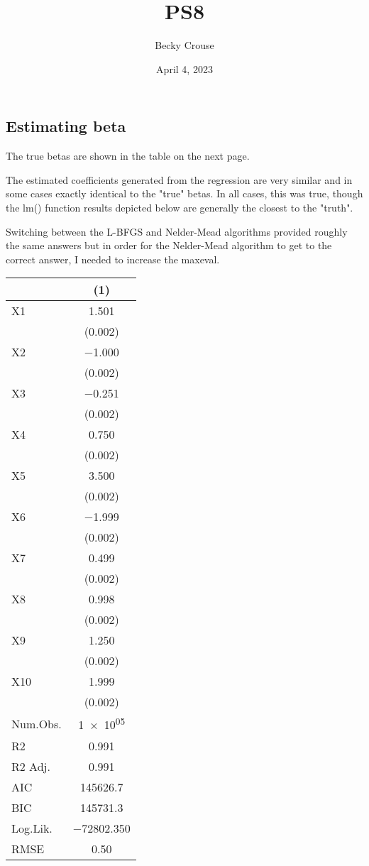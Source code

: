 \documentclass[nobib]{MSword}
\title{PS8}
\author{Becky Crouse}
\date{April 4, 2023}
\begin{document}
\maketitle

\subsection*{Estimating beta}
The true betas are shown in the table on the next page.

The estimated coefficients generated from the regression are very similar and in some cases exactly identical to the "true" betas. In all cases, this was true, though the lm() function results depicted below are generally the closest to the "truth".

Switching between the L-BFGS and Nelder-Mead algorithms provided roughly the same answers but in order for the Nelder-Mead algorithm to get to the correct answer, I needed to increase the maxeval.

\begin{table} [hbt!]
\centering
\begin{tabular}[t]{lc}
\toprule
  & (1)\\
\midrule
X1 & \num{1.501}\\
 & \vphantom{9} (\num{0.002})\\
X2 & \num{-1.000}\\
 & \vphantom{8} (\num{0.002})\\
X3 & \num{-0.251}\\
 & \vphantom{7} (\num{0.002})\\
X4 & \num{0.750}\\
 & \vphantom{6} (\num{0.002})\\
X5 & \num{3.500}\\
 & \vphantom{5} (\num{0.002})\\
X6 & \num{-1.999}\\
 & \vphantom{4} (\num{0.002})\\
X7 & \num{0.499}\\
 & \vphantom{3} (\num{0.002})\\
X8 & \num{0.998}\\
 & \vphantom{2} (\num{0.002})\\
X9 & \num{1.250}\\
 & \vphantom{1} (\num{0.002})\\
X10 & \num{1.999}\\
 & (\num{0.002})\\
\midrule
Num.Obs. & \num{1e+05}\\
R2 & \num{0.991}\\
R2 Adj. & \num{0.991}\\
AIC & \num{145626.7}\\
BIC & \num{145731.3}\\
Log.Lik. & \num{-72802.350}\\
RMSE & \num{0.50}\\
\bottomrule
\end{tabular}
\end{table}
\end{document}
